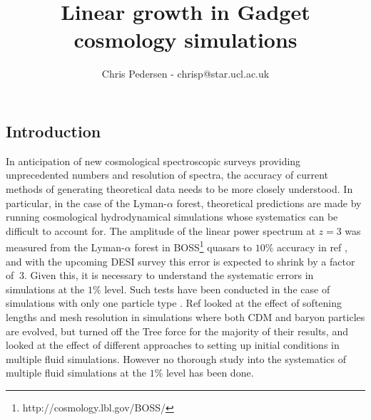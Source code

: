 \documentclass[]{article}
\title{Linear growth in Gadget cosmology simulations}
\author{Chris Pedersen - chrisp@star.ucl.ac.uk}
\begin{document}
	

\maketitle

\newline

\tableofcontents

\subsection{Introduction}
In anticipation of new cosmological spectroscopic surveys providing unprecedented numbers and resolution of spectra, the accuracy of current methods of generating theoretical data needs to be more closely understood. In particular, in the case of the Lyman-$\alpha$ forest, theoretical predictions are made by running cosmological hydrodynamical simulations whose systematics can be difficult to account for. The amplitude of the linear power spectrum at $z=3$ was measured from the Lyman-$\alpha$ forest in BOSS\footnote{http://cosmology.lbl.gov/BOSS/} quasars to $10\%$ accuracy in ref \cite{Chabanier2018}, and with the upcoming DESI survey\cite{DESI} this error is expected to shrink by a factor of $~3$. Given this, it is necessary to understand the systematic errors in simulations at the $1\%$ level. Such tests have been conducted in the case of simulations with only one particle type \cite{Schneider2016}. Ref \cite{Angulo2013} looked at the effect of softening lengths and mesh resolution in simulations where both CDM and baryon particles are evolved, but turned off the Tree force for the majority of their results, and \cite{Valkenburg2017} looked at the effect of different approaches to setting up initial conditions in multiple fluid simulations. However no thorough study into the systematics of multiple fluid simulations at the $1\%$ level has been done.
\end{document}
